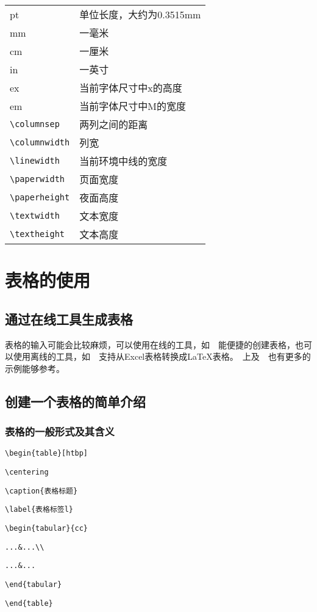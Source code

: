 \begin{tabular}{ll}
pt & 单位长度，大约为0.3515mm \\
mm & 一毫米 \\
cm & 一厘米 \\
in & 一英寸 \\
ex & 当前字体尺寸中x的高度 \\
em & 当前字体尺寸中M的宽度 \\
\verb|\columnsep| & 两列之间的距离 \\
\verb|\columnwidth| & 列宽 \\
\verb|\linewidth| & 当前环境中线的宽度 \\
\verb|\paperwidth| & 页面宽度 \\
\verb|\paperheight| & 夜面高度 \\
\verb|\textwidth| & 文本宽度 \\
\verb|\textheight| & 文本高度 \\
\end{tabular}

\section{表格的使用}

\subsection{通过在线工具生成表格}
表格的输入可能会比较麻烦，可以使用在线的工具，如~~能便捷的创建表格，也可以使用离线的工具，如~~支持从Excel表格转换成\LaTeX{}表格。~上及~~也有更多的示例能够参考。

\subsection{创建一个表格的简单介绍}
\subsubsection{表格的一般形式及其含义}

\verb|\begin{table}[htbp]|\par 
\verb|\centering|\par 
\verb|\caption{表格标题}|\par 
\verb|\label{表格标签l}|\par 
\verb|\begin{tabular}{cc}|\par 
\verb|...&...\\|\par 
\verb|...&...|\par 
\verb|\end{tabular}|\par 
\verb|\end{table}|\par 

